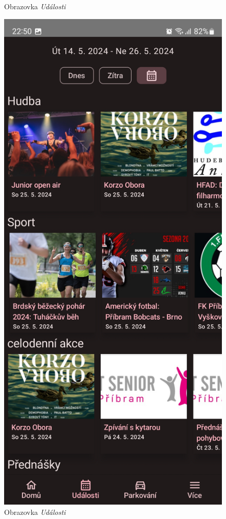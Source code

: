 \begin{figure}[H]
    \caption{Obrazovka \textit{Události}}
  \endminipage\hfill
    \includegraphics[width=\linewidth]{screens/2a_B.jpg}
    \caption{Obrazovka \textit{Události}}
  \endminipage\hfill
\end{figure}

